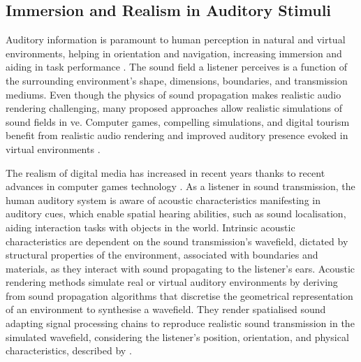 \subsection{Immersion and Realism in Auditory Stimuli}
Auditory information is paramount to human perception in natural and virtual environments, helping in orientation and navigation, increasing immersion and aiding in task performance \citep{lokki2005navigation, bork2015auditory, shivappa2016efficient}. The sound field a listener perceives is a function of the surrounding environment's shape, dimensions, boundaries, and transmission mediums. Even though the physics of sound propagation makes realistic audio rendering challenging, many proposed approaches allow realistic simulations of sound fields in \acrshort{ve}. Computer games, compelling simulations, and digital tourism benefit from realistic audio rendering and improved auditory presence evoked in virtual environments \citep{lokki2002creating, selmanovic2020vr}.\par
The realism of digital media has increased in recent years thanks to recent advances in computer games technology \citep{rubio2017immersive}. As a listener in sound transmission, the human auditory system is aware of acoustic characteristics manifesting in auditory cues, which enable spatial hearing abilities, such as sound localisation, aiding interaction tasks with objects in the world. Intrinsic acoustic characteristics are dependent on the sound transmission's wavefield, dictated by structural properties of the environment, associated with boundaries and materials, as they interact with sound propagating to the listener's ears. Acoustic rendering methods simulate real or virtual auditory environments by deriving from sound propagation algorithms that discretise the geometrical representation of an environment to synthesise a wavefield. They render spatialised sound adapting signal processing chains to reproduce realistic sound transmission in the simulated wavefield, considering the listener's position, orientation, and physical characteristics, described by  \citep{hulusic2012acoustic}.\par

